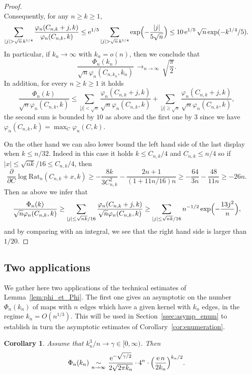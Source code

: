 \documentclass[10pt]{amsart}
\theoremstyle{plain}
\newtheorem{corollary}[theorem]{Corollary}
\theoremstyle{definition}
\theoremstyle{remark}
\newcommand{\e}{\operatorname{e}}
\newcommand{\cv}[1][n]{\,\mathop{\longrightarrow}^{}_{#1 \to \infty}\,}
\begin{document}
\begin{proof}
\[\]
Consequently, for any $n\ge k \ge 1$,
\[
\sum_{|j| > \sqrt{n}\,k^{1/4}} \frac{\varphi_{n}(C_{n,k}+j,k)}{\varphi_{n}(C_{n,k},k)}
\leq \e^{1/5} \sum_{|j| > \sqrt{n}\,k^{1/4}} \exp\Bigl(- \frac{|j|}{5\sqrt{n}}\Bigr)
\leq 10 \e^{1/5} \sqrt{n} \exp(- k^{1/4}/5).
\]
In particular, if $k_n \to\infty$ with $k_n = o(n)$, then we conclude that
\[
\frac{\Phi_n(k_n)}{\sqrt{n} \varphi_{n}(C_{n,k_n},k_n)} \cv \sqrt{\frac{\pi}{2}}.
\]
In addition, for every $n \ge k \ge 1$ it holds
\[
\frac{\Phi_n(k)}{\sqrt{n} \varphi_{n}(C_{n,k},k)}
\le \sum_{|j| < \sqrt{n}} \frac{\varphi_{n}(C_{n,k}+j,k)}{\sqrt{n} \varphi_{n}(C_{n,k},k)} + \sum_{|j| \ge \sqrt{n}} \frac{\varphi_{n}(C_{n,k}+j,k)}{\sqrt{n} \varphi_{n}(C_{n,k},k)},
\]
the second sum is bounded by $10$ as above and the first one by $3$ since we have $\varphi_{n}(C_{n,k},k) = \max_C \varphi_{n}(C,k)$.

On the other hand we can also lower bound the left hand side of the last display when $k \le n/32$. Indeed in this case it holds $k \le C_{n,k}/4$ and $C_{n,k} \le n/4$ so if $|x| \le \sqrt{nk}/16 \le C_{n,k}/4$, then\vspace*{-3pt}
\[
\frac{\partial}{\partial C} \log \mathrm{Rat}_n(C_{n,k}+x,k)
\ge - \frac{8k}{3 C_{n,k}^2} - \frac{2n+1}{(1+11n/16) n}
\ge - \frac{64}{3 n} - \frac{48}{11n}
\ge -26n.
\]
Then as above we infer that
\[
\frac{\Phi_n(k)}{\sqrt{n} \varphi_{n}(C_{n,k},k)}
\ge \sum_{|j| \leq \sqrt{nk}/16} \frac{\varphi_{n}(C_{n,k}+j,k)}{\sqrt{n} \varphi_{n}(C_{n,k},k)}
\ge \sum_{|j| \leq \sqrt{nk}/16} n^{-1/2} \exp\Bigl(-\frac{13 j^2}{n}\Bigr),
\]
and by comparing with an integral, we see that the right hand side is larger than \eg $1/20$.
\end{proof}

\subsection{Two applications}

We gather here two applications of the technical estimates of Lemma~\ref{lem:phi_et_Phi}. The first one gives an asymptotic on the number $\Phi_{n}(k_{n})$ of maps with $n$ edges which have a given kernel with $k_{n}$ edges, in the regime $k_n = O(n^{1/3})$. This will be used in Section~\ref{ssec:asymp_enum} to establish in turn the asymptotic estimates of Corollary~\ref{cor:enumeration}.

\begin{corollary}
\label{cor:equivPhikn}
Assume that $k_{n}^3/n \to \gamma \in [0,\infty)$. Then\vspace*{-3pt}
\[
\Phi_{n}(k_{n}) \, \mathop{\sim}_{n \rightarrow \infty} \,
\frac{\e^{- \sqrt{\gamma/2}}}{2\sqrt{2 \pi k_{n}}} \cdot 4^{n} \cdot \Bigl(\frac{\e n}{2 k_{n}}\Bigr)^{k_{n}/2}.
\]
\end{corollary}
\end{document}
